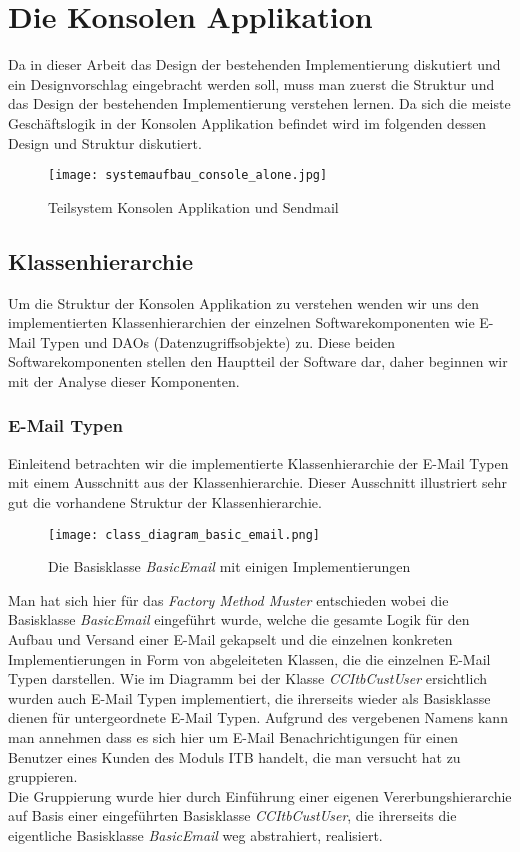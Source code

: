 \chapter{Die Konsolen Applikation}
\label{cha:the-console-app}
Da in dieser Arbeit das Design der bestehenden Implementierung diskutiert und ein Designvorschlag eingebracht werden soll, muss man zuerst die Struktur und das Design der bestehenden Implementierung verstehen lernen. Da sich die meiste Geschäftslogik in der Konsolen Applikation befindet wird im folgenden dessen Design und Struktur diskutiert.\\

\begin{figure}[h]
\centering
\texttt{[image: systemaufbau\_console\_alone.jpg]} 
\caption{Teilsystem Konsolen Applikation und Sendmail}
\label{fig:class-hierarchie-email}
\end{figure}


\newpage
\section{Klassenhierarchie}
\label{sec:console-app-class-hierarchie}
Um die Struktur der Konsolen Applikation  zu verstehen wenden wir uns den implementierten Klassenhierarchien der einzelnen Softwarekomponenten wie E-Mail Typen und DAOs (Datenzugriffsobjekte) zu. Diese beiden Softwarekomponenten stellen den Hauptteil der Software dar, daher beginnen wir mit der Analyse dieser Komponenten. 
\subsection{E-Mail Typen}
Einleitend betrachten wir die implementierte Klassenhierarchie der E-Mail Typen mit einem Ausschnitt aus der Klassenhierarchie. Dieser Ausschnitt illustriert sehr gut die vorhandene Struktur der Klassenhierarchie.
\begin{figure}[h]
\centering
\texttt{[image: class\_diagram\_basic\_email.png]} 
\caption{Die Basisklasse \emph{BasicEmail} mit einigen Implementierungen}
\label{fig:class-hierarchie-email}
\end{figure}

\newpage
Man hat sich hier für das \emph{Factory Method Muster} entschieden wobei die Basisklasse \emph{BasicEmail} eingeführt wurde, welche die gesamte Logik für den Aufbau und Versand einer E-Mail gekapselt und die einzelnen konkreten Implementierungen in Form von abgeleiteten Klassen, die die einzelnen E-Mail Typen darstellen. Wie im Diagramm bei der Klasse \emph{CCItbCustUser} ersichtlich wurden auch E-Mail Typen implementiert, die ihrerseits wieder als Basisklasse dienen für untergeordnete E-Mail Typen. Aufgrund des vergebenen Namens kann man annehmen dass es sich hier um E-Mail Benachrichtigungen für einen Benutzer eines Kunden des Moduls ITB handelt, die man versucht hat zu gruppieren.\\
Die Gruppierung wurde hier durch Einführung einer eigenen Vererbungshierarchie auf Basis einer eingeführten Basisklasse \emph{CCItbCustUser}, die ihrerseits die eigentliche Basisklasse \emph{BasicEmail} weg abstrahiert, realisiert.\\

